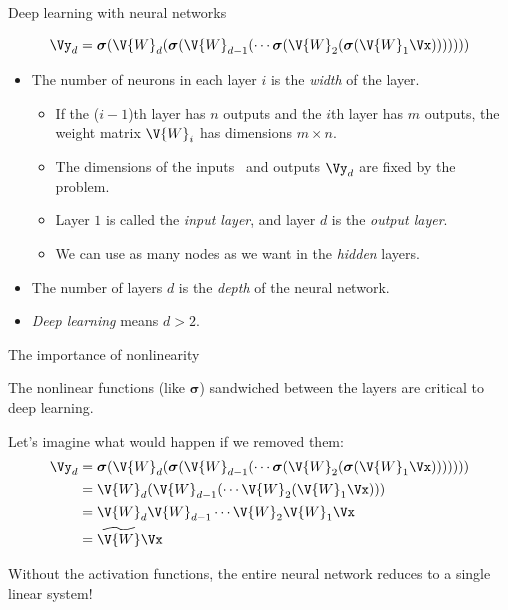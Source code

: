 \documentclass[9pt]{beamer}
\newcommand\bsigma{\boldsymbol{\sigma}}
\begin{document}
\begin{frame}{Deep learning with neural networks}

\[ \Vy_d = \bsigma(\V{W}_d(\bsigma(\V{W}_{d-1}(\cdots\bsigma(\V{W}_2(\bsigma(\V{W}_1\Vx))))))) \]

\bigskip
\begin{itemize}
	\item The number of neurons in each layer $i$ is the \emph{width} of the layer.
	\begin{itemize}
		\addtolength\itemsep{0.5\baselineskip}
		\item If the ($i-1$)th layer has $n$ outputs and the $i$th layer has $m$ outputs, the weight matrix $\V{W}_i$ has dimensions $m\times n$.
		\item The dimensions of the inputs \Vx\ and outputs $\Vy_d$ are fixed by the problem.
		\item Layer $1$ is called the \emph{input layer}, and layer $d$ is the \emph{output layer}.
		\item We can use as many nodes as we want in the \emph{hidden} layers.
	\end{itemize}
	\item<2-> The number of layers $d$ is the \emph{depth} of the neural network.
	\item<3-> \emph{Deep learning} means $d>2$.
\end{itemize}
	
\end{frame}

\begin{frame}{The importance of nonlinearity}

The nonlinear functions (like $\bsigma$) sandwiched between the layers are critical to deep learning.

\bigskip
Let's imagine what would happen if we removed them:
\begin{align*}
	\Vy_d &= \bsigma(\V{W}_d(\bsigma(\V{W}_{d-1}(\cdots\bsigma(\V{W}_2(\bsigma(\V{W}_1\Vx))))))) \\
		 &= \V{W}_d(\V{W}_{d-1}(\cdots\V{W}_2(\V{W}_1\Vx))) \\
		 &= \V{W}_d \V{W}_{d-1} \cdots \V{W}_2 \V{W}_1 \Vx \\
		 &= \widetilde{\V{W}}\Vx
\end{align*}

\pause
\bigskip
Without the activation functions, the entire neural network reduces to a single linear system!
	
\end{frame}
\end{document}
